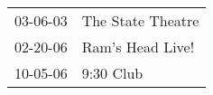 \begin{supertabular}{p{0.07\textwidth}p{0.23\textwidth}}
 03-06-03 &  The State Theatre \\
 02-20-06 &   Ram's Head Live! \\
 10-05-06 &          9:30 Club \\
\end{supertabular}
